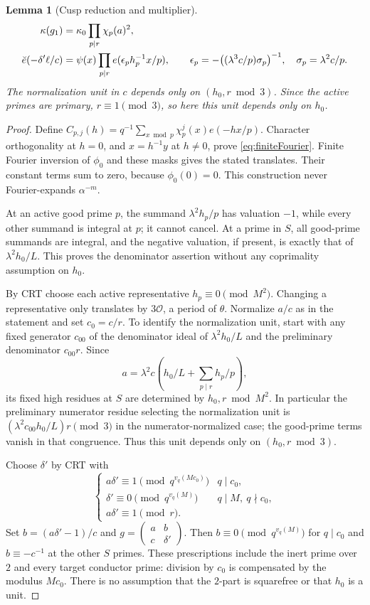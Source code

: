\documentclass[11pt,a4paper]{article}
\numberwithin{equation}{section}
\newtheorem{lemma}[theorem]{Lemma}
\theoremstyle{definition}
\theoremstyle{remark}
\newcommand{\OO}{\mathcal O}
\newcommand{\ve}{\breve e}
\begin{document}
\begin{lemma}[Cusp reduction and multiplier]
\begin{align}\label{eq:cuspCRT}
 \kappa(g_1)&=\kappa_0\prod_{p\mid r}\chi_p(a)^2,\\
 \ve(-\delta'\ell/c)&=\psi(x)\prod_{p\mid r}e(\epsilon_ph_p^{-1}x/p),\qquad
 \epsilon_p=-\bigl((\lambda^3c/p)\sigma_p\bigr)^{-1},\quad \sigma_p=\lambda^2c/p.\notag
\end{align}
The normalization unit in $c$ depends only on $(h_0,r\bmod3)$. Since the active primes are primary, $r\equiv1\pmod3$, so here this unit depends only on $h_0$.
\end{lemma}
\begin{proof}
Define $C_{p,j}(h)=q^{-1}\sum_{x\bmod p}\chi_p^j(x)e(-hx/p)$. Character orthogonality at $h=0$, and $x=h^{-1}y$ at $h\ne0$, prove \eqref{eq:finiteFourier}. Finite Fourier inversion of $\phi_0$ and these masks gives the stated translates. Their constant terms sum to zero, because $\phi_0(0)=0$. This construction never Fourier-expands $\alpha^{-m}$.

At an active good prime $p$, the summand $\lambda^2h_p/p$ has valuation $-1$, while every other summand is integral at $p$; it cannot cancel. At a prime in $S$, all good-prime summands are integral, and the negative valuation, if present, is exactly that of $\lambda^2h_0/L$. This proves the denominator assertion without any coprimality assumption on $h_0$.

By CRT choose each active representative $h_p\equiv0\pmod{M^2}$. Changing a representative only translates by $3\OO$, a period of $\theta$. Normalize $a/c$ as in the statement and set $c_0=c/r$. To identify the normalization unit, start with any fixed generator $c_{00}$ of the denominator ideal of $\lambda^2h_0/L$ and the preliminary denominator $c_{00}r$. Since
\[
 a=\lambda^2c\left(h_0/L+\sum_{p\mid r}h_p/p\right),
\]
its fixed high residues at $S$ are determined by $h_0,r\bmod M^2$. In particular the preliminary numerator residue selecting the normalization unit is $(\lambda^2c_{00}h_0/L)r\pmod3$ in the numerator-normalized case; the good-prime terms vanish in that congruence. Thus this unit depends only on $(h_0,r\bmod3)$.

Choose $\delta'$ by CRT with
\[
 \begin{cases}
 a\delta'\equiv1\pmod{q^{v_q(Mc_0)}}&q\mid c_0,\\
 \delta'\equiv0\pmod{q^{v_q(M)}}&q\mid M,\ q\nmid c_0,\\
 a\delta'\equiv1\pmod r.&
 \end{cases}
\]
Set $b=(a\delta'-1)/c$ and $g={\left(\begin{smallmatrix}a&b\\c&\delta'\end{smallmatrix}\right)}$. Then $b\equiv0\pmod{q^{v_q(M)}}$ for $q\mid c_0$ and $b\equiv-c^{-1}$ at the other $S$ primes. These prescriptions include the inert prime over $2$ and every target conductor prime: division by $c_0$ is compensated by the modulus $Mc_0$. There is no assumption that the $2$-part is squarefree or that $h_0$ is a unit.


\end{proof}
\end{document}
